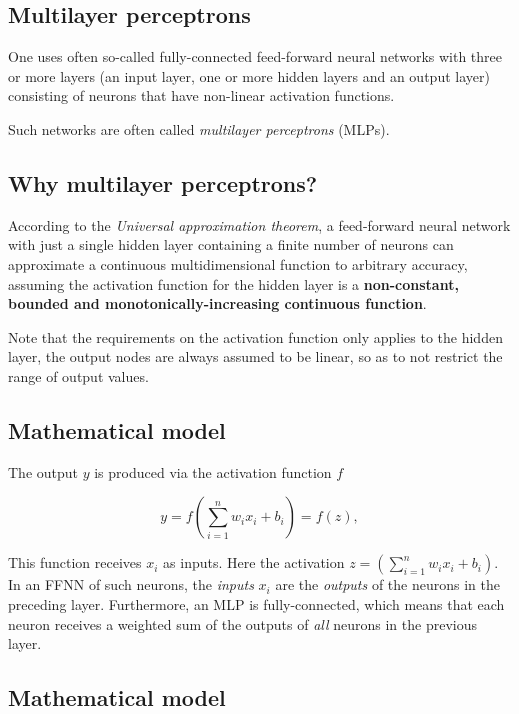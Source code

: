 \documentclass[11pt]{article}
\begin{document}
\hypertarget{multilayer-perceptrons}{%
\subsection{Multilayer perceptrons}\label{multilayer-perceptrons}}

One uses often so-called fully-connected feed-forward neural networks
with three or more layers (an input layer, one or more hidden layers and
an output layer) consisting of neurons that have non-linear activation
functions.

Such networks are often called \emph{multilayer perceptrons} (MLPs).

\hypertarget{why-multilayer-perceptrons}{%
\subsection{Why multilayer
perceptrons?}\label{why-multilayer-perceptrons}}

According to the \emph{Universal approximation theorem}, a feed-forward
neural network with just a single hidden layer containing a finite
number of neurons can approximate a continuous multidimensional function
to arbitrary accuracy, assuming the activation function for the hidden
layer is a \textbf{non-constant, bounded and monotonically-increasing
continuous function}.

Note that the requirements on the activation function only applies to
the hidden layer, the output nodes are always assumed to be linear, so
as to not restrict the range of output values.

\hypertarget{mathematical-model}{%
\subsection{Mathematical model}\label{mathematical-model}}

The output \(y\) is produced via the activation function \(f\)

    \[
y = f\left(\sum_{i=1}^n w_ix_i + b_i\right) = f(z),
\]

    This function receives \(x_i\) as inputs. Here the activation
\(z=(\sum_{i=1}^n w_ix_i+b_i)\). In an FFNN of such neurons, the
\emph{inputs} \(x_i\) are the \emph{outputs} of the neurons in the
preceding layer. Furthermore, an MLP is fully-connected, which means
that each neuron receives a weighted sum of the outputs of \emph{all}
neurons in the previous layer.

\hypertarget{mathematical-model}{%
\subsection{Mathematical model}\label{mathematical-model}}
\end{document}
